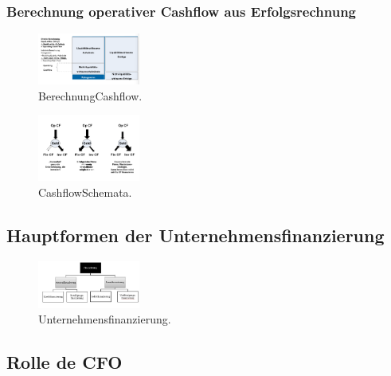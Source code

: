 \documentclass[../ZF_Wing.tex]{subfiles}
\begin{document}
\subsubsection{Berechnung operativer Cashflow aus Erfolgsrechnung}
\begin{multicols}{2}
\begin{figure}[H]
\includegraphics[width=0.3\textwidth]{Resources/Image/BerechnungCashflow.png}
\caption{\label{fig:BerechnungCashflow}BerechnungCashflow.}
\end{figure}

\columnbreak

\begin{figure}[H]
\includegraphics[width=0.3\textwidth]{Resources/Image/CashflowSchemata.png}
\caption{\label{fig:CashflowSchemata}CashflowSchemata.}
\end{figure}

\end{multicols}


\subsection{Hauptformen der Unternehmensfinanzierung}

\begin{figure}[H]
\centering
\includegraphics[width=0.3\textwidth]{Resources/Image/Unternehmensfinanzierung.png}
\caption{\label{fig:Unternehmensfinanzierung}Unternehmensfinanzierung.}
\end{figure}

\subsection{Rolle de CFO}

\end{document}
